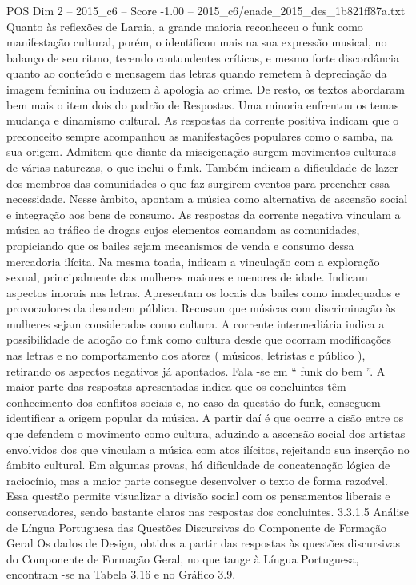 \begin{textsample}{POS Dim 2 – 2015\_c6 – Score -1.00 – 2015\_c6/enade\_2015\_des\_1b821ff87a.txt}
Quanto às reflexões de Laraia, a grande maioria reconheceu o funk como manifestação cultural, porém, o identificou mais na sua expressão musical, no balanço de seu ritmo, tecendo contundentes críticas, e mesmo forte discordância quanto ao conteúdo e mensagem das letras quando remetem à depreciação da imagem feminina ou induzem à apologia ao crime.
De resto, os textos abordaram bem mais o item dois do padrão de Respostas.
Uma minoria enfrentou os temas mudança e dinamismo cultural.
As respostas da corrente positiva indicam que o preconceito sempre acompanhou as manifestações populares como o samba, na sua origem.
Admitem que diante da miscigenação surgem movimentos culturais de várias naturezas, o que inclui o funk.
Também indicam a dificuldade de lazer dos membros das comunidades o que faz surgirem eventos para preencher essa necessidade.
Nesse âmbito, apontam a música como alternativa de ascensão social e integração aos bens de consumo.
As respostas da corrente negativa vinculam a música ao tráfico de drogas cujos elementos comandam as comunidades, propiciando que os bailes sejam mecanismos de venda e consumo dessa mercadoria ilícita.
Na mesma toada, indicam a vinculação com a exploração sexual, principalmente das mulheres maiores e menores de idade.
Indicam aspectos imorais nas letras.
Apresentam os locais dos bailes como inadequados e provocadores da desordem pública.
Recusam que músicas com discriminação às mulheres sejam consideradas como cultura.
A corrente intermediária indica a possibilidade de adoção do funk como cultura desde que ocorram modificações nas letras e no comportamento dos atores ( músicos, letristas e público ), retirando os aspectos negativos já apontados.
Fala -se em “ funk do bem ”.
A maior parte das respostas apresentadas indica que os concluintes têm conhecimento dos conflitos sociais e, no caso da questão do funk, conseguem identificar a origem popular da música.
A partir daí é que ocorre a cisão entre os que defendem o movimento como cultura, aduzindo a ascensão social dos artistas envolvidos dos que vinculam a música com atos ilícitos, rejeitando sua inserção no âmbito cultural.
Em algumas provas, há dificuldade de concatenação lógica de raciocínio, mas a maior parte consegue desenvolver o texto de forma razoável.
Essa questão permite visualizar a divisão social com os pensamentos liberais e conservadores, sendo bastante claros nas respostas dos concluintes. 3.3.1.5 Análise de Língua Portuguesa das Questões Discursivas do Componente de Formação Geral Os dados de Design, obtidos a partir das respostas às questões discursivas do Componente de Formação Geral, no que tange à Língua Portuguesa, encontram -se na Tabela 3.16 e no Gráfico 3.9.

\end{textsample}
